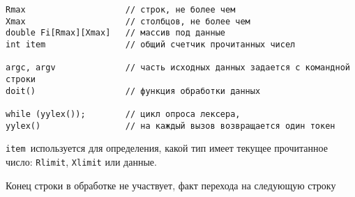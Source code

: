 
\begin{verbatim}
Rmax 					// строк, не более чем 
Xmax 					// столбцов, не более чем
double Fi[Rmax][Xmax]	// массив под данные
int item				// общий счетчик прочитанных чисел

argc, argv				// часть исходных данных задается с командной строки
doit()					// функция обработки данных

while (yylex());		// цикл опроса лексера,
yylex()					// на каждый вызов возвращается один токен
\end{verbatim}

\verb|item|\ используется для определения, какой тип имеет текущее 
прочитанное число: \verb|Rlimit|, \verb|Xlimit| или данные.

Конец строки в обработке не участвует, факт перехода на следующую строку
